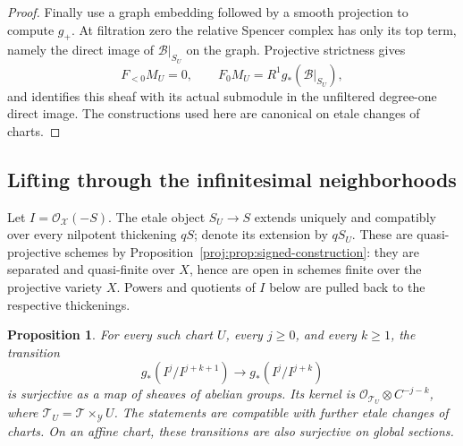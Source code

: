 \documentclass[11pt,letterpaper]{article}
\newcommand{\OO}{\mathcal{O}}
\newtheorem{proposition}[theorem]{Proposition}
\theoremstyle{definition}
\theoremstyle{remark}
\begin{document}
\begin{proof}
Finally use a graph embedding followed by a smooth projection to
compute \(g_+\).  At filtration zero the relative Spencer complex
has only its top term, namely the direct image of
\(\mathcal B|_{S_U}\) on the graph.  Projective strictness gives
\[
 F_{<0}M_U=0,\qquad
 F_0M_U=R^1g_*(\mathcal B|_{S_U}),
\]
and identifies this sheaf with its actual submodule in the
unfiltered degree-one direct image.  The constructions used here
are canonical on etale changes of charts.
\end{proof}

\subsection{Lifting through the infinitesimal neighborhoods}

Let \(I=\OO_{\mathcal X}(-S)\).  The etale object \(S_U\to S\)
extends uniquely and compatibly over every nilpotent thickening
\(qS\); denote its extension by \(qS_U\).
These are quasi-projective schemes by
Proposition~\ref{proj:prop:signed-construction}: they are separated
and quasi-finite over \(X\), hence are open in schemes finite over
the projective variety \(X\).  Powers and quotients of \(I\) below
are pulled back to the respective thickenings.

\begin{proposition}\label{proj:prop:formal-lifting}
For every such chart \(U\), every \(j\geq0\), and every \(k\geq1\),
the transition
\[
 g_*(I^j/I^{j+k+1})
       \longrightarrow g_*(I^j/I^{j+k})
\]
is surjective as a map of sheaves of abelian groups.  Its kernel is
\(\OO_{\mathcal T_U}\otimes C^{-j-k}\), where
\(\mathcal T_U=\mathcal T\times_{\mathcal Y}U\).
The statements are compatible with further etale changes of
charts.  On an affine chart, these transitions are also
surjective on global sections.
\end{proposition}
\end{document}
